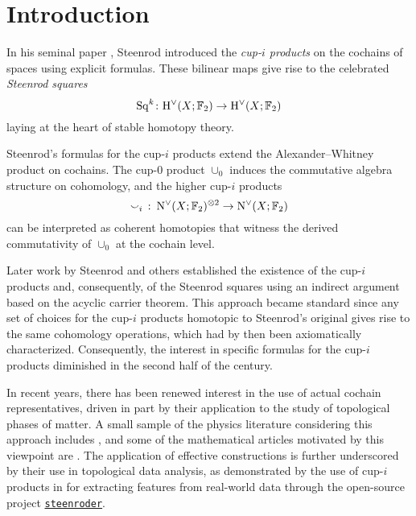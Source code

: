 
\section{Introduction}\label{s:introduction}

In his seminal paper \cite{steenrod1947products}, Steenrod introduced the \textit{cup-$i$ products} on the cochains of spaces using explicit formulas.
These bilinear maps give rise to the celebrated \textit{Steenrod squares}
\[
\operatorname{Sq}^k \colon \mathrm{H}^\vee(X; {\mathbb{F}_2}) \to \mathrm{H}^\vee(X; {\mathbb{F}_2})
\]
laying at the heart of stable homotopy theory.

Steenrod's formulas for the cup-$i$ products extend the Alexander--Whitney product on cochains.
The cup-$0$ product $\cup_0$ induces the commutative algebra structure on cohomology, and the higher cup-$i$ products
\[
\smallsmile_i\ \colon \operatorname{N^{\vee}}(X; {\mathbb{F}_2})^{\otimes 2} \to \operatorname{N^{\vee}}(X; {\mathbb{F}_2})
\]
can be interpreted as coherent homotopies that witness the derived commutativity of $\cup_0$ at the cochain level.

Later work by Steenrod and others established the existence of the cup-$i$ products and, consequently, of the Steenrod squares using an indirect argument based on the acyclic carrier theorem.
This approach became standard since any set of choices for the cup-$i$ products homotopic to Steenrod's original gives rise to the same cohomology operations, which had by then been axiomatically characterized.
Consequently, the interest in specific formulas for the cup-$i$ products diminished in the second half of the century.

In recent years, there has been renewed interest in the use of actual cochain representatives, driven in part by their application to the study of topological phases of matter.
A small sample of the physics literature considering this approach includes \cite{gaiotto2016spin, kapustin2017fermionic, meng2018classification, wang2020construction, barkeshli2021classification, tata2021anomalies, tata2021cubical}, and some of the mathematical articles motivated by this viewpoint are \cite{brumfiel2016pontrjagin, brumfiel2018pontrjagin, medina2020cartan, medina2021adem}.
The application of effective constructions is further underscored by their use in topological data analysis, as demonstrated by the use of cup-$i$ products in \cite{medina2022per_st} for extracting features from real-world data through the open-source project \href{https://github.com/Steenroder/steenroder}{\texttt{steenroder}}.


